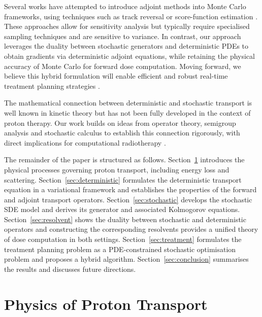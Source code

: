 \documentclass{amsart}
\theoremstyle{plain}
\begin{document}
Several works have attempted to introduce adjoint methods into Monte
Carlo frameworks, using techniques such as track reversal or
score-function estimation
\cite{difilippo1996adjoint,lux2018monte}. These approaches allow for
sensitivity analysis but typically require specialised sampling
techniques and are sensitive to variance. In contrast, our approach
leverages the duality between stochastic generators and deterministic
PDEs to obtain gradients via deterministic adjoint equations, while
retaining the physical accuracy of Monte Carlo for forward dose
computation. Moving forward, we believe this hybrid formulation will
enable efficient and robust real-time treatment planning strategies
\cite{paganetti2025proton,georgiou2025scotty}.

The mathematical connection between deterministic and stochastic
transport is well known in kinetic theory but has not been fully
developed in the context of proton therapy. Our work builds on ideas
from operator theory, semigroup analysis and stochastic calculus to
establish this connection rigorously, with direct implications for
computational radiotherapy
\cite{oksendal2013stochastic,pavliotis2014stochastic,lions1971optimal}.

The remainder of the paper is structured as
follows. Section~\ref{sec:physics} introduces the physical processes
governing proton transport, including energy loss and
scattering. Section~\ref{sec:deterministic} formulates the
deterministic transport equation in a variational framework and
establishes the properties of the forward and adjoint transport
operators. Section~\ref{sec:stochastic} develops the stochastic SDE
model and derives its generator and associated Kolmogorov
equations. Section~\ref{sec:resolvent} shows the duality between
stochastic and deterministic operators and constructing the
corresponding resolvents provides a unified theory of dose computation
in both settings. Section~\ref{sec:treatment} formulates the treatment
planning problem as a PDE-constrained stochastic optimisation problem
and proposes a hybrid algorithm. Section~\ref{sec:conclusion}
summarises the results and discusses future directions.

\section{Physics of Proton Transport}
\label{sec:physics}
\end{document}
